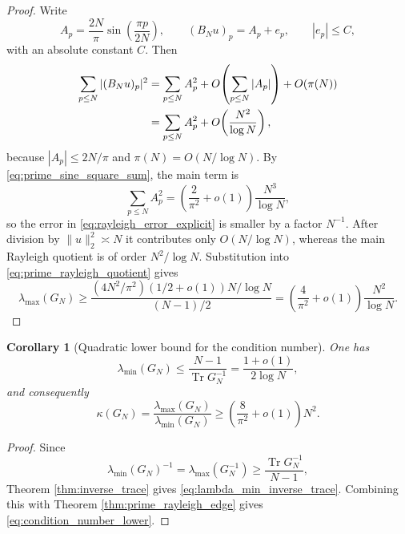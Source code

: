 \documentclass[11pt]{amsart}
\numberwithin{equation}{section}
\theoremstyle{plain}
\newtheorem{corollary}[theorem]{Corollary}
\theoremstyle{definition}
\theoremstyle{remark}
\newcommand{\Tr}{\operatorname{Tr}}
\begin{document}
\begin{proof}
Write
\begin{equation}
A_p=\frac{2N}{\pi}\sin\!\left(\frac{\pi p}{2N}\right),
\qquad
(B_Nu)_p=A_p+e_p,
\qquad |e_p|\le C,
\end{equation}
with an absolute constant $C$.  Then
\begin{align}
\sum_{p\le N}|(B_Nu)_p|^2
&=\sum_{p\le N}A_p^2
 +O\!\left(\sum_{p\le N}|A_p|\right)
 +O(\pi(N))\notag\\
&=\sum_{p\le N}A_p^2
 +O\!\left(\frac{N^2}{\log N}\right),
\label{eq:rayleigh_error_explicit}
\end{align}
because $|A_p|\le 2N/\pi$ and $\pi(N)=O(N/\log N)$.  By \eqref{eq:prime_sine_square_sum}, the main term is
\begin{equation}
\sum_{p\le N}A_p^2
=\left(\frac{2}{\pi^2}+o(1)\right)\frac{N^3}{\log N},
\end{equation}
so the error in \eqref{eq:rayleigh_error_explicit} is smaller by a factor $N^{-1}$.  After division by $\|u\|_2^2\asymp N$ it contributes only $O(N/\log N)$, whereas the main Rayleigh quotient is of order $N^2/\log N$.  Substitution into \eqref{eq:prime_rayleigh_quotient} gives
\begin{equation}
\lambda_{\max}(G_N)
\ge
\frac{(4N^2/\pi^2)(1/2+o(1))N/\log N}{(N-1)/2}
=
\left(\frac4{\pi^2}+o(1)\right)\frac{N^2}{\log N}.
\end{equation}
\end{proof}

\begin{corollary}[Quadratic lower bound for the condition number]
\label{cor:condition_number_lower}
One has
\begin{equation}
\lambda_{\min}(G_N)
\le \frac{N-1}{\Tr G_N^{-1}}
=\frac{1+o(1)}{2\log N},
\label{eq:lambda_min_inverse_trace}
\end{equation}
and consequently
\begin{equation}
\kappa(G_N)
=\frac{\lambda_{\max}(G_N)}{\lambda_{\min}(G_N)}
\ge
\left(\frac{8}{\pi^2}+o(1)\right)N^2.
\label{eq:condition_number_lower}
\end{equation}
\end{corollary}

\begin{proof}
Since
\begin{equation}
\lambda_{\min}(G_N)^{-1}
=\lambda_{\max}(G_N^{-1})
\ge \frac{\Tr G_N^{-1}}{N-1},
\end{equation}
Theorem \ref{thm:inverse_trace} gives \eqref{eq:lambda_min_inverse_trace}.  Combining this with Theorem \ref{thm:prime_rayleigh_edge} gives \eqref{eq:condition_number_lower}.
\end{proof}
\end{document}
